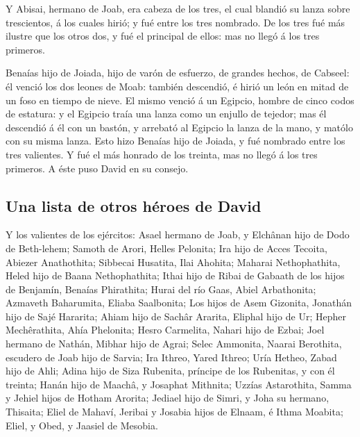  Y Abisai, hermano de Joab, era cabeza de los tres, el
cual blandió su lanza sobre trescientos, á los cuales hirió; y fué entre
los tres nombrado.  De los tres fué más ilustre que los
otros dos, y fué el principal de ellos: mas no llegó á los tres
primeros.

 Benaías hijo de Joiada, hijo de varón de esfuerzo, de
grandes hechos, de Cabseel: él venció los dos leones de Moab: también
descendió, é hirió un león en mitad de un foso en tiempo de nieve.
 El mismo venció á un Egipcio, hombre de cinco codos de
estatura: y el Egipcio traía una lanza como un enjullo de tejedor; mas
él descendió á él con un bastón, y arrebató al Egipcio la lanza de la
mano, y matólo con su misma lanza.  Esto hizo Benaías
hijo de Joiada, y fué nombrado entre los tres valientes. 
Y fué el más honrado de los treinta, mas no llegó á los tres primeros. A
éste puso David en su consejo.

\hypertarget{una-lista-de-otros-huxe9roes-de-david}{%
\subsection{Una lista de otros héroes de
David}\label{una-lista-de-otros-huxe9roes-de-david}}

 Y los valientes de los ejércitos: Asael hermano de Joab,
y Elchânan hijo de Dodo de Beth-lehem;  Samoth de Arori,
Helles Pelonita;  Ira hijo de Acces Tecoita, Abiezer
Anathothita;  Sibbecai Husatita, Ilai Ahohita;
 Maharai Nethophathita, Heled hijo de Baana
Nethophathita;  Ithai hijo de Ribai de Gabaath de los
hijos de Benjamín, Benaías Phirathita;  Hurai del río
Gaas, Abiel Arbathonita;  Azmaveth Baharumita, Eliaba
Saalbonita;  Los hijos de Asem Gizonita, Jonathán hijo de
Sajé Hararita;  Ahiam hijo de Sachâr Ararita, Eliphal
hijo de Ur;  Hepher Mechêrathita, Ahía Phelonita;
 Hesro Carmelita, Nahari hijo de Ezbai; 
Joel hermano de Nathán, Mibhar hijo de Agrai;  Selec
Ammonita, Naarai Berothita, escudero de Joab hijo de Sarvia;
 Ira Ithreo, Yared Ithreo;  Uría Hetheo,
Zabad hijo de Ahli;  Adina hijo de Siza Rubenita,
príncipe de los Rubenitas, y con él treinta;  Hanán hijo
de Maachâ, y Josaphat Mithnita;  Uzzías Astarothita,
Samma y Jehiel hijos de Hotham Arorita;  Jediael hijo de
Simri, y Joha su hermano, Thisaita;  Eliel de Mahaví,
Jeribai y Josabia hijos de Elnaam, é Ithma Moabita; 
Eliel, y Obed, y Jaasiel de Mesobia.

